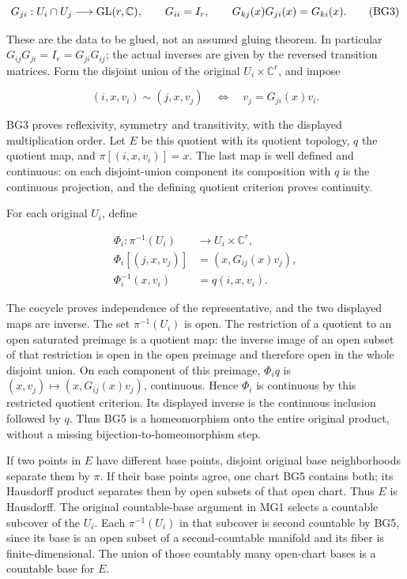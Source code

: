 \documentclass[
  11pt,
]{article}
\begin{document}
\[
 G_{ji}:U_i\cap U_j\longrightarrow {\rm GL}(r,\mathbb C),
 \qquad
 G_{ii}=I_r,\qquad
 G_{kj}(x)G_{ji}(x)=G_{ki}(x).
 \tag{BG3}
\]

These are the data to be glued, not an assumed gluing theorem. In
particular \(G_{ij}G_{ji}=I_r=G_{ji}G_{ij}\); the actual inverses are
given by the reversed transition matrices. Form the disjoint union of
the original \(U_i\times\mathbb C^r\), and impose

\[
 (i,x,v_i)\sim(j,x,v_j)
 \quad\Longleftrightarrow\quad
 v_j=G_{ji}(x)v_i .
 \tag{BG4}
\]

BG3 proves reflexivity, symmetry and transitivity, with the displayed
multiplication order. Let \(E\) be this quotient with its quotient
topology, \(q\) the quotient map, and \(\pi[(i,x,v_i)]=x\). The last map
is well defined and continuous: on each disjoint-union component its
composition with \(q\) is the continuous projection, and the defining
quotient criterion proves continuity.

For each original \(U_i\), define

\[
 \begin{aligned}
 \Phi_i:\pi^{-1}(U_i)&\longrightarrow U_i\times\mathbb C^r,\\
 \Phi_i[(j,x,v_j)]&=(x,G_{ij}(x)v_j),\\
 \Phi_i^{-1}(x,v_i)&=q(i,x,v_i).
 \end{aligned}
 \tag{BG5}
\]

The cocycle proves independence of the representative, and the two
displayed maps are inverse. The set \(\pi^{-1}(U_i)\) is open. The
restriction of a quotient to an open saturated preimage is a quotient
map: the inverse image of an open subset of that restriction is open in
the open preimage and therefore open in the whole disjoint union. On
each component of this preimage, \(\Phi_iq\) is
\((x,v_j)\mapsto(x,G_{ij}(x)v_j)\), continuous. Hence \(\Phi_i\) is
continuous by this restricted quotient criterion. Its displayed inverse
is the continuous inclusion followed by \(q\). Thus BG5 is a
homeomorphism onto the entire original product, without a missing
bijection-to-homeomorphism step.

If two points in \(E\) have different base points, disjoint original
base neighborhoods separate them by \(\pi\). If their base points agree,
one chart BG5 contains both; its Hausdorff product separates them by
open subsets of that open chart. Thus \(E\) is Hausdorff. The original
countable-base argument in MG1 selects a countable subcover of the
\(U_i\). Each \(\pi^{-1}(U_i)\) in that subcover is second countable by
BG5, since its base is an open subset of a second-countable manifold and
its fiber is finite-dimensional. The union of those countably many
open-chart bases is a countable base for \(E\).
\end{document}
